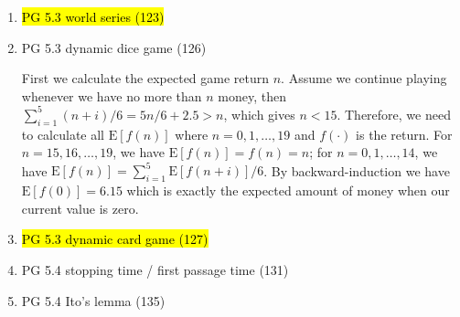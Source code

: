 \documentclass[10pt]{article}
\newcommand{\E}{\text{E}}
\newenvironment{note}{\begin{enumerate}[leftmargin=1em,topsep=0pt,noitemsep]}{\end{enumerate}}
\newcommand{\solution}{\boxed{\textbf{SOLUTION}}\hspace{.5em}}
\begin{document}
\begin{spacing}{1.1}
\begin{note}
      \solution In the third throw we have $1/6$ probability for each result $x$, which leads to the expected value $\E[V_3]=3.5$, while we're not necessarily optimal to choose to throw the third time. Actually, our possible values for the second throw are
      $$
      V_2 = \begin{cases}
      3.5 & \text{if we get $1,2,3$},\\
      4 & \text{if we get $4$},\\
      5 & \text{if we get $5$},\\
      6 & \text{if we get $6$}\\
      \end{cases}
      $$
      and each has probability $1/6$, so $\E[V_2]=4.25$. Further, conditional on the first throw, we can actually have better choices, namely
      $$
      V_1 = \begin{cases}
      4.25 & \text{if we get $1,2,3,4$},\\
      5 & \text{if we get $5$},\\
      6 & \text{if we get $6$}\\
      \end{cases}
      $$
      and thus $\E[V_1]=14/3$.

\item \hl{PG 5.3 world series (123)}

\item PG 5.3 dynamic dice game (126)
      
      \solution First we calculate the expected game return $n$. Assume we continue playing whenever we have no more than $n$ money, then $\sum_{i=1}^5 (n+i)/6 = 5n/6 + 2.5 > n$, which gives $n < 15$. Therefore, we need to calculate all $\E[f(n)]$ where $n=0,1,\ldots,19$ and $f(\cdot)$ is the return. For $n=15,16,\ldots,19$, we have $\E[f(n)]=f(n)=n$; for $n=0,1,\ldots,14$, we have $\E[f(n)]=\sum_{i=1}^5 \E[f(n+i)]/6$. By backward-induction we have $\E[f(0)]=6.15$ which is exactly the expected amount of money when our current value is zero.

\item \hl{PG 5.3 dynamic card game (127)}

\item PG 5.4 stopping time / first passage time (131)

\item PG 5.4 Ito's lemma (135)

\end{note}



\end{spacing}
\end{document}
